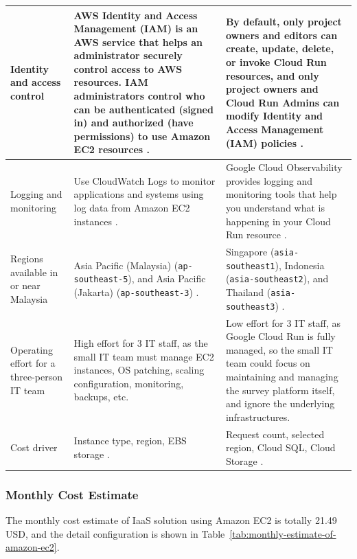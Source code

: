 \begin{longtable}{|P{3.5cm}|P{6cm}|P{6cm}|}
	\\
	\hline
	Identity and access control
	 &
	AWS Identity and Access Management (IAM) is an AWS service that helps an administrator securely control access to AWS resources. IAM administrators control who can be authenticated (signed in) and authorized (have permissions) to use Amazon EC2 resources \parencite{aws_ec2_identity_access_management}.
	 &
	By default, only project owners and editors can create, update, delete, or invoke Cloud Run resources, and only project owners and Cloud Run Admins can modify Identity and Access Management (IAM) policies \parencite{google_cloud_run_access_control}.
	\\
	\hline
	Logging and monitoring
	 &
	Use CloudWatch Logs to monitor applications and systems using log data from Amazon EC2 instances \parencite{aws_cloudwatch_logs}.
	 &
	Google Cloud Observability provides logging and monitoring tools that help you understand what is happening in your Cloud Run resource \parencite{google_cloud_run_monitoring}.
	\\
	\hline
	Regions available in or near Malaysia
	 &
	Asia Pacific (Malaysia) (\texttt{ap-southeast-5}), and Asia Pacific (Jakarta) (\texttt{ap-southeast-3}) \parencite{aws_regions}.
	 &
	Singapore (\texttt{asia-southeast1}), Indonesia (\texttt{asia-southeast2}), and Thailand (\texttt{asia-southeast3}) \parencite{google_region}.
	\\
	\hline
	Operating effort for a three-person IT team
	 &
	High effort for 3 IT staff, as the small IT team must manage EC2 instances, OS patching, scaling configuration, monitoring, backups, etc.
	 &
	Low effort for 3 IT staff, as Google Cloud Run is fully managed, so the small IT team could focus on maintaining and managing the survey platform itself, and ignore the underlying infrastructures.
	\\
	\hline
	Cost driver
	 &
	Instance type, region, EBS storage \parencite{aws_calculator}.
	 &
	Request count, selected region, Cloud SQL, Cloud Storage \parencite{google_cloud_pricing_calculator}.
	\\
	\hline
\end{longtable}

\subsubsection{Monthly Cost Estimate}

The monthly cost estimate of IaaS solution using Amazon EC2 is totally 21.49 USD, and the detail configuration is shown in Table~\ref{tab:monthly-estimate-of-amazon-ec2}.

